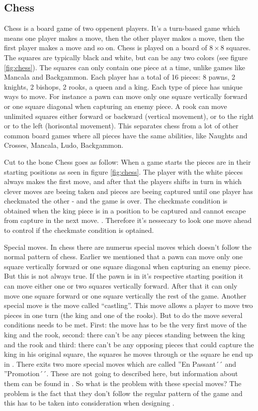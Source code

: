 \subsection{Chess}
Chess is a board game of two oppenent players. It's a turn-based game which means one player makes a move, 
then the other player makes a move, then the first player makes a move and so on. Chess is played on a board of $8 \times 8$ squares. The squares are typically black and white, but can be any two colors (see figure \ref{fig:chess}). The squares can only contain one piece at a time, unlike games like Mancala and Backgammon. Each player has a total of 16 pieces: 8 pawns, 2 knights, 2 bishops, 2 rooks, a queen and a king. Each type of piece has unique ways to move. For instance a pawn can move only one square vertically forward or one square diagonal when capturing an enemy piece. A rook can move unlimited squares either forward or backward (vertical movement), or to the right or to the left (horisontal movement). This separates chess from a lot of other common board games where all pieces have the same abilities, like Naughts and Crosses, Mancala, Ludo, Backgammon.  

Cut to the bone Chess goes as follow: When a game starts the pieces are in their starting positions as seen in figure \ref{fig:chess}. The player with the white pieces always makes the first move, and after that the players shifts in turn in which clever moves are beeing taken and pieces are beeing captured until one player has checkmated the other - and the game is over. The checkmate condition is obtained when the king piece is in a position to be captured and cannot escape from capture in the next move. \cite{chessrules}. Therefore it's nessecary to look one move ahead to control if the checkmate condition is optained.

Special moves. In chess there are numerus special moves which doesn't follow the normal pattern of chess. Earlier we mentioned that a pawn can move only one square vertically forward or one square diagonal when capturing an enemy piece. But this is not always true. If the pawn is in it's respective starting position it can move either one or two squares vertically forward. After that it can only move one square forward or one square vertically the rest of the game. Another special move is the move called ``castling''. This move allows a player to move two pieces in one turn (the king and one of the rooks). But to do the move several conditions needs to be met. First: the move has to be the very first move of the king and the rook, second: there can't be any pieces standing between the king and the rook and third: there can't be any opposing pieces that could capture the king in his original square, the squares he moves through or the square he end up in \cite{chessrules}. There exits two more special moves which are called ''En Passant´´ and ''Promotion´´. These are not going to described here, but information about them can be found in \cite{chessrules}. So what is the problem with these special moves? The problem is the fact that they don't follow the regular pattern of the game and this has to be taken into consideration when designing \productname{}.

